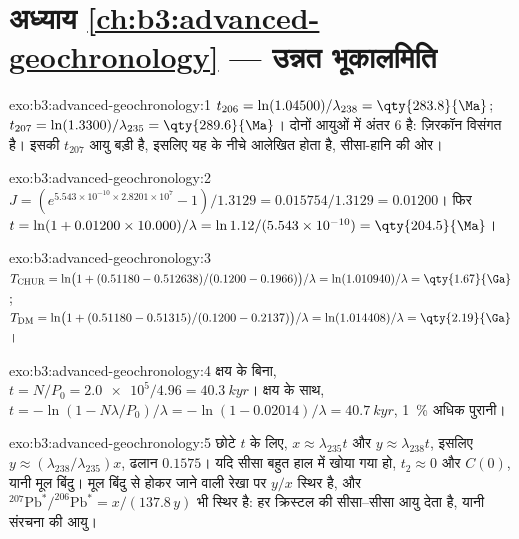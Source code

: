 \section*{अध्याय \ref{ch:b3:advanced-geochronology} --- उन्नत भूकालमिति}

\begin{solution}{exo:b3:advanced-geochronology:1}
$t_{206} = \ln(1.04500)/\lambda_{238} = \qty{283.8}{\Ma}$; $t_{207} =
\ln(1.3300)/\lambda_{235} = \qty{289.6}{\Ma}$। दोनों आयुओं में अंतर
\qty{6}{\Ma} है: ज़िरकॉन विसंगत है। इसकी $t_{207}$ आयु बड़ी है, इसलिए यह
 के नीचे आलेखित होता है, सीसा-हानि की ओर।
\end{solution}

\begin{solution}{exo:b3:advanced-geochronology:2}
$J = (e^{5.543\times10^{-10}\times2.8201\times10^7} - 1)/1.3129 =
0.015754/1.3129 = 0.01200$। फिर $t = \ln(1 + 0.01200\times10.000)/\lambda =
\ln 1.12/(5.543\times10^{-10}) = \qty{204.5}{\Ma}$।
\end{solution}

\begin{solution}{exo:b3:advanced-geochronology:3}
$T_{\mathrm{CHUR}} = \ln\bigl(1 + (0.51180 - 0.512638)/(0.1200 -
0.1966)\bigr)/\lambda = \ln(1.010940)/\lambda = \qty{1.67}{\Ga}$;
$T_{\mathrm{DM}} = \ln\bigl(1 + (0.51180 - 0.51315)/(0.1200 - 0.2137)\bigr)/\lambda
= \ln(1.014408)/\lambda = \qty{2.19}{\Ga}$।
\end{solution}

\begin{solution}{exo:b3:advanced-geochronology:4}
क्षय के बिना, $t = N/P_0 = \num{2.0e5}/4.96 = \qty{40.3}{kyr}$। क्षय के साथ,
$t = -\ln(1 - N\lambda/P_0)/\lambda = -\ln(1 - 0.02014)/\lambda =
\qty{40.7}{kyr}$, \qty{1}{\percent} अधिक पुरानी।
\end{solution}

\begin{solution}{exo:b3:advanced-geochronology:5}
छोटे $t$ के लिए, $x \approx \lambda_{235}t$ और $y \approx \lambda_{238}t$, इसलिए
$y \approx (\lambda_{238}/\lambda_{235})x$, ढलान $0.1575$। यदि सीसा
बहुत हाल में खोया गया हो, $t_2 \approx 0$ और  $C(0)$,
यानी मूल बिंदु। मूल बिंदु से होकर जाने वाली रेखा पर $y/x$ स्थिर है, और
$^{207}\mathrm{Pb}^*/^{206}\mathrm{Pb}^* = x/(137.8\,y)$ भी स्थिर है: हर क्रिस्टल
 की सीसा--सीसा आयु देता है, यानी संरचना की आयु।
\end{solution}

